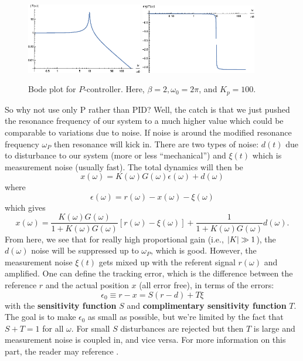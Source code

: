 \documentclass{article}
\theoremstyle{definition}
\newcommand{\f}[2]{\frac{#1}{#2}}
\begin{document}
\begin{figure}
	\centering
	\includegraphics[width=0.45\textwidth]{bode_5}
	\quad
	\includegraphics[width=0.45\textwidth]{bode_6}
	\caption{Bode plot for $P$-controller. Here, $\beta = 2,\omega_0 = 2\pi$, and $K_p = 100$.} %
	\label{fig:bode_3}
\end{figure}



So why not use only P rather than PID? Well, the catch is that we just pushed the resonance frequency of our system to a much higher value which could be comparable to variations due to noise. If noise is around the modified resonance frequency $\omega_P$ then resonance will kick in. There are two types of noise: $d(t)$ due to disturbance to our system (more or less ``mechanical'') and $\xi(t)$ which is measurement noise (usually fast). The total dynamics will then be 
\begin{equation*}
x(\omega) = K(\omega)G(\omega) \epsilon(\omega) + d(\omega)
\end{equation*}
where 
\begin{equation*}
\epsilon(\omega) = r(\omega) - x(\omega) - \xi(\omega)
\end{equation*}
which gives
\begin{equation*}
x(\omega) = \f{K(\omega)G(\omega)}{1+K(\omega)G(\omega)}[r(\omega)-\xi(\omega)] + \f{1}{1+K(\omega)G(\omega)}d(\omega).
\end{equation*}
From here, we see that for really high proportional gain (i.e., $\abs{K} \gg 1$), the $d(\omega)$ noise will be suppressed up to $\omega_P$, which is good. However, the measurement noise $\xi(t)$ gets mixed up with the referent signal $r(\omega)$ and amplified. One can define the tracking error, which is the difference between the reference $r$ and the actual position $x$ (all error free), in terms of the errors:
\begin{equation*}
\epsilon_0 \equiv r - x = S(r-d) + T\xi
\end{equation*}
with the \textbf{sensitivity function} $S$ and \textbf{complimentary sensitivity function} $T$. The goal is to make $\epsilon_0$ as small as possible, but we're limited by the fact that $S+T=1$ for all $\omega$. For small $S$ disturbances are rejected but then $T$ is large and measurement noise is coupled in, and vice versa.
For more information on this part, the reader may reference \cite{bechhoefer2005feedback}.
\end{document}
